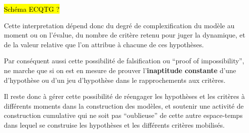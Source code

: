 \hl{Schéma ECQTG ?}

Cette interpretation dépend donc du degré de complexification du modèle au moment ou on l'évalue, du nombre de critère retenu pour juger la dynamique, et de la valeur relative que l'on attribue à chacune de ces hypothèses.

Par conséquent aussi cette possibilité de falsification ou \foreignquote{english}{proof of impossibility}, ne marche que si on est en mesure de prouver l'\textbf{inaptitude constante} d'une d'hypothèse ou d'un jeu d'hypothèse dans le rapprochements aux critères. 

Il reste donc à gérer cette possibilité de réengager les hypothèses et les critères à différents moments dans la construction des modèles, et soutenir une activité de construction cumulative qui ne soit pas \enquote{oublieuse} de cette autre espace-temps dans lequel se construise les hypothèses et les différents critères mobilisés. 

